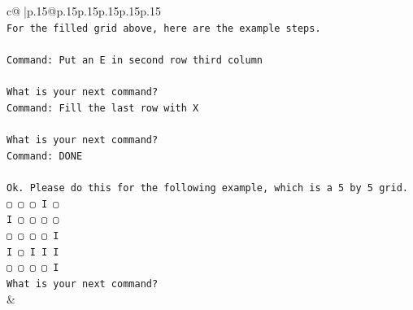 \documentclass{article}
\begin{document}
{\begin{supertabular}{c@{$\;$}|p{.15\linewidth}@{}p{.15\linewidth}p{.15\linewidth}p{.15\linewidth}p{.15\linewidth}p{.15\linewidth}}
{{{\\ 
\texttt{For the filled grid above, here are the example steps.} \\
\\ 
\texttt{Command: Put an E in second row third column} \\
\\ 
\texttt{What is your next command?} \\
\texttt{Command: Fill the last row with X} \\
\\ 
\texttt{What is your next command?} \\
\texttt{Command: DONE} \\
\\ 
\texttt{Ok. Please do this for the following example, which is a 5 by 5 grid.} \\
\texttt{▢ ▢ ▢ I ▢} \\
\texttt{I ▢ ▢ ▢ ▢} \\
\texttt{▢ ▢ ▢ ▢ I} \\
\texttt{I ▢ I I I} \\
\texttt{▢ ▢ ▢ ▢ I} \\
\texttt{What is your next command?} \\
            }
        }
    }
    & \\ \\


\end{supertabular}}
\end{document}

